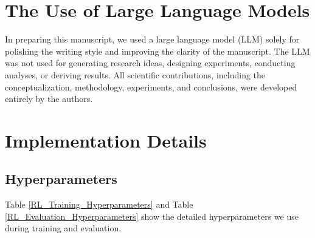 \documentclass{article} %
\begin{document}
% 
\newpage


\newpage
\appendix
\section{The Use of Large Language Models}
In preparing this manuscript, we used a large language model (LLM) solely for polishing the writing style and improving the clarity of the manuscript. The LLM was not used for generating research ideas, designing experiments, conducting analyses, or deriving results. All scientific contributions, including the conceptualization, methodology, experiments, and conclusions, were developed entirely by the authors.

\section{Implementation Details}
\label{detailssec}
\subsection{Hyperparameters}
Table \ref{RL_Training_Hyperparameters} and Table \ref{RL_Evaluation_Hyperparameters} show the detailed hyperparameters we use during training and evaluation.
\end{document}
